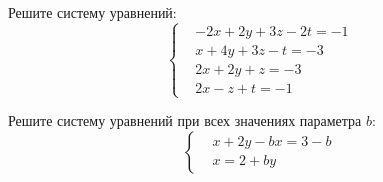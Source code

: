 %
%



\begin{problems}

\item
Решите систему уравнений:
\[\left\{\begin{aligned}&
    -2x +2y +3z -2t = -1
\\&
      x +4y +3z  -t = -3
\\&
     2x +2y  +z     = -3
\\&
     2x      -z  +t = -1
\end{aligned}\right.\]

\item
Решите систему уравнений при всех значениях параметра ${b}$:
\[\left\{\begin{aligned}&
    x + 2 y - {b} x = 3 - {b}
\\&
    x = 2 + {b} y
\end{aligned}\right.\]

\end{problems}


